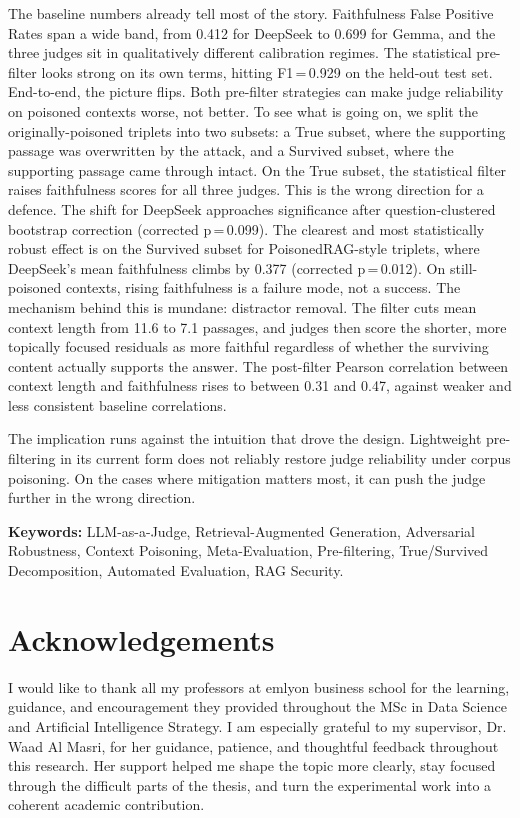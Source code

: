 The baseline numbers already tell most of the story. Faithfulness False Positive Rates span a wide band, from 0.412 for DeepSeek to 0.699 for Gemma, and the three judges sit in qualitatively different calibration regimes. The statistical pre-filter looks strong on its own terms, hitting F1\,=\,0.929 on the held-out test set. End-to-end, the picture flips. Both pre-filter strategies can make judge reliability on poisoned contexts worse, not better. To see what is going on, we split the originally-poisoned triplets into two subsets: a True subset, where the supporting passage was overwritten by the attack, and a Survived subset, where the supporting passage came through intact. On the True subset, the statistical filter raises faithfulness scores for all three judges. This is the wrong direction for a defence. The shift for DeepSeek approaches significance after question-clustered bootstrap correction (corrected p\,=\,0.099). The clearest and most statistically robust effect is on the Survived subset for PoisonedRAG-style triplets, where DeepSeek's mean faithfulness climbs by 0.377 (corrected p\,=\,0.012). On still-poisoned contexts, rising faithfulness is a failure mode, not a success. The mechanism behind this is mundane: distractor removal. The filter cuts mean context length from 11.6 to 7.1 passages, and judges then score the shorter, more topically focused residuals as more faithful regardless of whether the surviving content actually supports the answer. The post-filter Pearson correlation between context length and faithfulness rises to between 0.31 and 0.47, against weaker and less consistent baseline correlations.

The implication runs against the intuition that drove the design. Lightweight pre-filtering in its current form does not reliably restore judge reliability under corpus poisoning. On the cases where mitigation matters most, it can push the judge further in the wrong direction.

\textbf{Keywords:} LLM-as-a-Judge, Retrieval-Augmented Generation, Adversarial Robustness, Context Poisoning, Meta-Evaluation, Pre-filtering, True/Survived Decomposition, Automated Evaluation, RAG Security.

\chapter*{Acknowledgements}

I would like to thank all my professors at emlyon business school for the learning, guidance, and encouragement they provided throughout the MSc in Data Science and Artificial Intelligence Strategy. I am especially grateful to my supervisor, Dr. Waad Al Masri, for her guidance, patience, and thoughtful feedback throughout this research. Her support helped me shape the topic more clearly, stay focused through the difficult parts of the thesis, and turn the experimental work into a coherent academic contribution.

